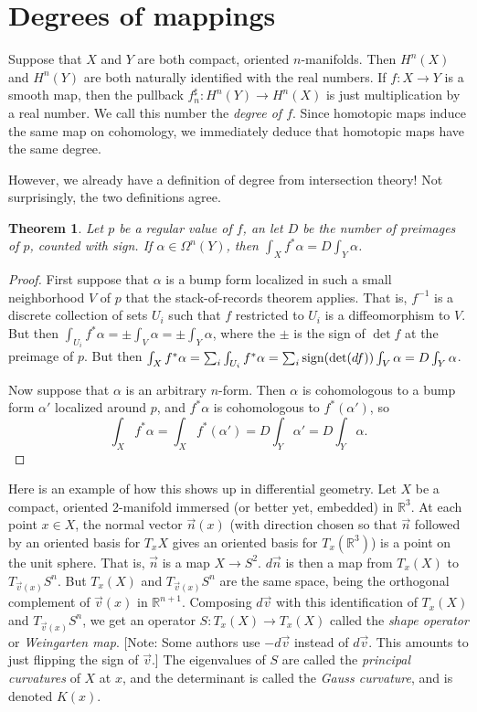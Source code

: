 \documentclass[12pt]{amsbook}
\newcommand{\R}{{\mathbb R}}
\newtheorem{thm}{Theorem}[section]
\theoremstyle{definition}
\begin{document}
\section{Degrees of mappings}
    
Suppose that $X$ and $Y$ are both compact, oriented
$n$-manifolds. Then $H^n(X)$ and $H^n(Y)$ are both naturally
identified with the real numbers. If $f: X \to Y$ is a smooth map,
then the pullback $f_n^\sharp: H^n(Y) \to H^n(X)$ is just
multiplication by a real number. We call this number the {\em degree
  of $f$}. Since homotopic maps induce the same map on cohomology, we
immediately deduce that homotopic maps have the same degree.

However, we already have a definition of degree from intersection
theory! Not surprisingly, the two definitions agree.

\begin{thm} Let $p$ be a regular value of $f$, an let $D$ be the
  number of preimages of $p$, counted with sign.  If $\alpha \in
  \Omega^n(Y)$, then $\int_X f^*\alpha = D \int_Y \alpha$.
\end{thm}

\begin{proof} First suppose that $\alpha$ is a bump form localized in
  such a small neighborhood $V$ of $p$ that the stack-of-records
  theorem applies.  That is, $f^{-1}$ is a discrete collection of sets
  $U_i$ such that $f$ restricted to $U_i$ is a diffeomorphism to $V$.
  But then $\int_{U_i} f^*\alpha = \pm \int_V \alpha = \pm \int_Y\alpha$,
where the $\pm$ is the sign of $\det f$ at the preimage of $p$. 
But then $\int_X f^* \alpha = \sum_i \int_{U_i} f^* \alpha = \sum_i
  \hbox{sign}(\det(df)) \int_V \alpha = D \int_Y \alpha$.

  Now suppose that $\alpha$ is an arbitrary $n$-form. Then $\alpha$ is
  cohomologous to a bump form $\alpha'$ localized around $p$, and
  $f^*\alpha$ is cohomologous to $f^*(\alpha')$, so
$$ \int_X f^*\alpha = \int_X f^*(\alpha') = D \int_Y \alpha' = D \int_Y \alpha.$$
\end{proof}

Here is an example of how this shows up in differential geometry. Let
$X$ be a compact, oriented 2-manifold immersed (or better yet,
embedded) in $\R^3$. At each point $x \in X$, the normal vector $\vec
n(x)$ (with direction chosen so that $\vec n$ followed by an oriented
basis for $T_xX$ gives an oriented basis for $T_x(\R^3)$) is a point
on the unit sphere. That is, $\vec n$ is a map $X \to S^2$. $d \vec n$ is
then a map from $T_x(X)$ to $T_{\vec v(x)}S^n$. But $T_x(X)$ and $T_{\vec v(x)}S^n$
are the same space, being the orthogonal complement of $\vec v(x)$ in 
$\R^{n+1}$. Composing $d \vec v$ 
with this identification of $T_x(X)$ and $T_{\vec v(x)}S^n$, we get an operator
$S: T_x(X) \to T_x(X)$ called the {\em shape operator} or {\em Weingarten
map}. [Note: Some authors use $-d\vec v$ instead of $d \vec v$. This
amounts to just flipping the sign of $\vec v$.] The eigenvalues of $S$ are 
called the {\em principal curvatures} of $X$ at $x$, and the determinant
is called the {\em Gauss curvature}, and is denoted $K(x)$.
\end{document}
